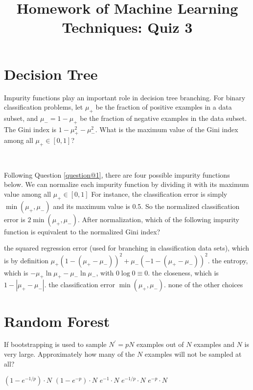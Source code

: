 \documentclass[a4paper,10pt]{exam}
\title{Homework of Machine Learning Techniques: Quiz 3}
\date{}
\author{}
\begin{document}
\maketitle
\section*{Decision Tree}
\begin{questions}
	\question Impurity functions play an important role in decision tree branching. For binary classification problems, let $\mu_+$ be the fraction of positive examples in a data subset, and $\mu_- = 1 - \mu_+$ be the fraction of negative examples in the data subset.
	The Gini index is $1 - \mu_+^2 - \mu_-^2$. What is the maximum value of the Gini index among all $\mu_+ \in [0, 1]$?
	\begin{checkboxes}
		\\
	\end{checkboxes}

	\question Following Question \ref{question@1}, there are four possible impurity functions below. We can normalize each impurity function by dividing it with its maximum value among all $\mu_+ \in [0, 1]$ For instance, the classification error is simply $\min(\mu_+, \mu_-)$ and its maximum value is 0.5. So the normalized classification error is $2 \min(\mu_+, \mu_-)$. After normalization, which of the following impurity function is equivalent to the normalized Gini index?

	\begin{checkboxes}
		\CorrectChoice the squared regression error (used for branching in classification data sets), which is by definition $\mu_+ (1 - (\mu_+ - \mu_-))^2 + \mu_- (-1 - (\mu_+ - \mu_-))^2$.
		\choice the entropy, which is $-\mu_+ \ln \mu_+ - \mu_- \ln \mu_-$, with $0 \log 0 \equiv 0$.
		\choice the closeness, which is $1 - |\mu_+ - \mu_-|$.
		\choice the classification error $\min(\mu_+, \mu_-)$.
		\choice none of the other choices\\
	\end{checkboxes}

	\section*{Random Forest}
	\question
	If bootstrapping is used to sample $N^\prime = pN$ examples out of $N$ examples and $N$ is very large. Approximately how many of the $N$ examples will not be sampled at all?
	\begin{checkboxes}
		\choice $(1 - e^{-1/p}) \cdot N$
		\choice $(1 - e^{-p}) \cdot N$
		\choice $e^{-1} \cdot N$
		\choice $e^{-1/p} \cdot N$
		\CorrectChoice $e^{-p} \cdot N$\\
	\end{checkboxes}


\end{questions}
\end{document}

